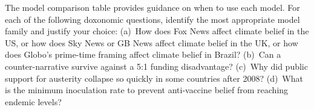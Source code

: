 \begin{exercise}
The model comparison table provides guidance on when to use each model.
For each of the following doxonomic questions, identify the most appropriate model family and justify your choice:
(a)~How does Fox News affect climate belief in the US, or how does Sky News or GB News affect climate belief in the UK, or how does Globo's prime-time framing affect climate belief in Brazil?
(b)~Can a counter-narrative survive against a 5:1 funding disadvantage?
(c)~Why did public support for austerity collapse so quickly in some countries after 2008?
(d)~What is the minimum inoculation rate to prevent anti-vaccine belief from reaching endemic levels?
\end{exercise}
